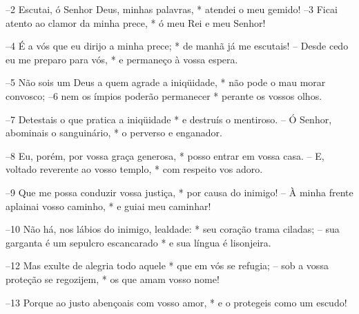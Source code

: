 –2 Escutai, ó Senhor Deus, minhas palavras, *
atendei o meu gemido! 
–3 Ficai atento ao clamor da minha prece, *
ó meu Rei e meu Senhor!

–4 É a vós que eu dirijo a minha prece; *
de manhã já me escutais! 
– Desde cedo eu me preparo para vós, *
e permaneço à vossa espera.

–5 Não sois um Deus a quem agrade a iniqüidade, *
não pode o mau morar convosco; 
–6 nem os ímpios poderão permanecer *
perante os vossos olhos.

–7 Detestais o que pratica a iniqüidade *
e destruís o mentiroso. 
– Ó Senhor, abominais o sanguinário, *
o perverso e enganador.

–8 Eu, porém, por vossa graça generosa, *
posso entrar em vossa casa. 
– E, voltado reverente ao vosso templo, *
com respeito vos adoro.

–9 Que me possa conduzir vossa justiça, *
por causa do inimigo! 
– À minha frente aplainai vosso caminho, *
e guiai meu caminhar! 

–10 Não há, nos lábios do inimigo, lealdade: *
seu coração trama ciladas; 
– sua garganta é um sepulcro escancarado *
e sua língua é lisonjeira.

–12 Mas exulte de alegria todo aquele *
que em vós se refugia; 
– sob a vossa proteção se regozijem, *
os que amam vosso nome!

–13 Porque ao justo abençoais com vosso amor, *
e o protegeis como um escudo!